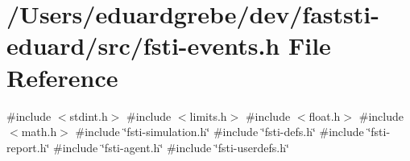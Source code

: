\hypertarget{fsti-events_8h}{}\section{/\+Users/eduardgrebe/dev/faststi-\/eduard/src/fsti-\/events.h File Reference}
\label{fsti-events_8h}
{\ttfamily \#include $<$stdint.\+h$>$}\newline
{\ttfamily \#include $<$limits.\+h$>$}\newline
{\ttfamily \#include $<$float.\+h$>$}\newline
{\ttfamily \#include $<$math.\+h$>$}\newline
{\ttfamily \#include \char`\"{}fsti-\/simulation.\+h\char`\"{}}\newline
{\ttfamily \#include \char`\"{}fsti-\/defs.\+h\char`\"{}}\newline
{\ttfamily \#include \char`\"{}fsti-\/report.\+h\char`\"{}}\newline
{\ttfamily \#include \char`\"{}fsti-\/agent.\+h\char`\"{}}\newline
{\ttfamily \#include \char`\"{}fsti-\/userdefs.\+h\char`\"{}}\newline
